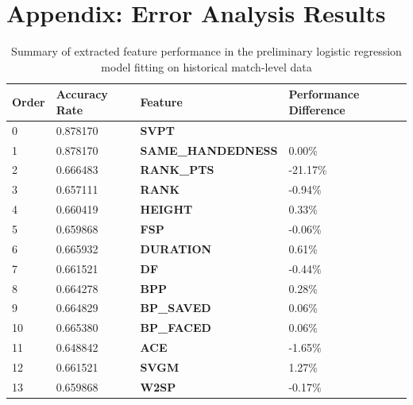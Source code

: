 \documentclass[paper=a4, fontsize=11pt]{scrartcl} %
\numberwithin{equation}{section} %
\numberwithin{figure}{section} %
\numberwithin{table}{section} %
\begin{document}
\section{Appendix: Error Analysis Results}
\begin{center}
\begin{table}[h]
    \begin{tabular}{  l | l | l | p{5cm} }
    \hline
Order &     Accuracy Rate    &         Feature    &  Performance Difference \\ \hline
0    &    0.878170 &              \textbf{SVPT}  &      \\ \hline
1    &    0.878170 &        \textbf{SAME\_HANDEDNESS}  & 0.00\% \\ \hline
2    &    0.666483 &          \textbf{RANK\_PTS} & -21.17\% \\ \hline
3    &    0.657111 &              \textbf{RANK} & -0.94\% \\ \hline
4    &    0.660419 &            \textbf{HEIGHT} & 0.33\% \\ \hline
5    &    0.659868 &  \textbf{FSP} & -0.06\% \\ \hline
6    &    0.665932 &       \textbf{DURATION} &  0.61\% \\ \hline
7    &    0.661521 &                \textbf{DF} & -0.44\% \\ \hline
8    &    0.664278 &    \textbf{BPP} &  0.28\% \\ \hline
9    &    0.664829 &         \textbf{BP\_SAVED} &  0.06\% \\ \hline
10   &    0.665380 &          \textbf{BP\_FACED}  & 0.06\% \\ \hline
11   &    0.648842 &    \textbf{ACE} & -1.65\% \\ \hline
12   &    0.661521 &             \textbf{SVGM} & 1.27\% \\ \hline
13   &    0.659868 & \textbf{W2SP} & -0.17\% \\ \hline
    \end{tabular}
    \caption{Summary of extracted feature performance in the preliminary logistic regression model fitting on historical match-level data}
    \label{tab:logreg_curr}
    \end{table}
\end{center}


 
\end{document}
